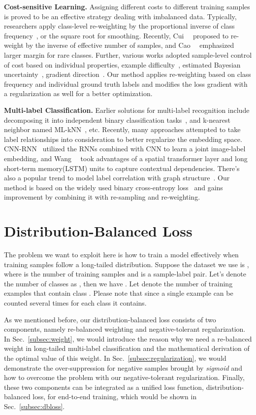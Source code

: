 \documentclass[runningheads]{llncs}
\begin{document}
\noindent\textbf{Cost-sensitive Learning.}
Assigning different costs to different training samples is proved to be an effective strategy dealing with imbalanced data.
Typically, researchers apply class-level re-weighting by the proportional inverse of class frequency~\cite{huang2016learning,wang2017learning}, or the square root for smoothing. Recently, Cui~\etal~\cite{cui2019cb} proposed to re-weight by the inverse of effective number of samples, and Cao~\etal~\cite{cao2019ldam} emphasized larger margin for rare classes.
Further, various works adopted sample-level control of cost based on individual properties, \eg example difficulty~\cite{lin2017focal}, estimated Bayesian uncertainty~\cite{khan2019striking}, gradient direction~\cite{ren2018learning}.
Our method applies re-weighting based on class frequency and individual ground truth labels and modifies the loss gradient with a regularization as well for a better optimization.

\noindent\textbf{Multi-label Classification.}
Earlier solutions for multi-label recognition include decomposing it into independent binary classification tasks~\cite{tsoumakas2007overview}, and k-nearest neighbor named ML-kNN~\cite{zhang2007mlknn}, etc.
Recently, many approaches attempted to take label relationships into consideration to better regularize the embedding space. 
CNN-RNN~\cite{wang2016cnnrnn} utilized the RNNs combined with CNN to learn a joint image-label embedding, and Wang~\etal~\cite{wang2017recurrently} took advantages of a spatial transformer layer and long short-term memory(LSTM) units to capture contextual dependencies. There's also a popular trend to model label correlation with graph structure~\cite{lee2018multizero,chen2019mlgcn}.
Our method is based on the widely used binary cross-entropy loss~\cite{dur2019partial} and gains improvement by combining it with re-sampling and re-weighting.
 \section{Distribution-Balanced Loss} 
The problem we want to exploit here is how to train a model effectively when training samples follow a long-tailed distribution.
Suppose the dataset we use is ,
where  is the number of training samples and  is a sample-label pair.
Let's denote the number of classes as , then we have .
Let  denote the number of training examples that contain class .
Please note that  since a single example can be counted several times for each class it contains.

As we mentioned before, our distribution-balanced loss consists of two components, namely re-balanced weighting and negative-tolerant regularization.
In Sec.~\ref{subsec:weight}, we would introduce the reason why we need a re-balanced weight in long-tailed multi-label classification
and the mathematical derivation of the optimal value of this weight.
In Sec.~\ref{subsec:regularization}, we would demonstrate the over-suppression for negative samples brought by \textit{sigmoid} and how to overcome the problem with our negative-tolerant regularization.
Finally, these two components can be integrated as a unified loss function, \ie distribution-balanced loss, for end-to-end training, which would be shown in Sec.~\ref{subsec:dbloss}.
\end{document}

